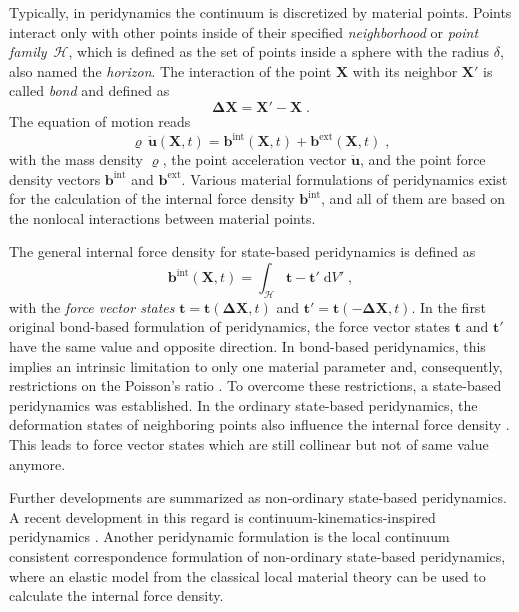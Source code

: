 \documentclass{juliacon}
\newcommand{\vb}{\boldsymbol}
\begin{document}
Typically, in peridynamics the continuum is discretized by material points.
Points interact only with other points inside of their specified \emph{neighborhood} or \emph{point family}~$\mathcal{H}$, which is defined as the set of points inside a sphere with the radius $\delta$, also named the \emph{horizon}.
The interaction of the point $\vb{X}$ with its neighbor $\vb{X}'$ is called \emph{bond} and defined as
\begin{equation}
\vb{\Delta X} = \vb{X}' - \vb{X} \; .
\end{equation}
The equation of motion reads
\begin{equation}
\varrho \, \vb{\ddot{u}}(\vb{X},t) = \vb{b}^{\mathrm{int}}(\vb{X},t) + \vb{b}^{\mathrm{ext}}(\vb{X},t) \; ,
\end{equation} 
with the mass density $\varrho$, the point acceleration vector $\vb{\ddot{u}}$, and the point force density vectors $\vb{b}^{\mathrm{int}}$ and $\vb{b}^{\mathrm{ext}}$.
Various material formulations of peridynamics exist for the calculation of the internal force density $\vb{b}^{\mathrm{int}}$, and all of them are based on the nonlocal interactions between material points.

The general internal force density for state-based peridynamics is defined as
\begin{equation}
\vb{b}^{\mathrm{int}} (\vb{X},t) = \int_\mathcal{H} \vb{t} - \vb{t}' \; \mathrm{d}V' \; ,
\end{equation}
with the \emph{force vector states} $\vb{t}=\vb{t}(\vb{\Delta X}, t)$ and $\vb{t}'=\vb{t}(-\vb{\Delta X}, t)$.
In the first original bond-based formulation of peridynamics, the force vector states $\vb{t}$ and  $\vb{t}'$ have the same value and opposite direction.
In bond-based peridynamics, this implies an intrinsic limitation to only one material parameter and, consequently, restrictions on the Poisson's ratio  \cite{Silling2007}.
To overcome these restrictions, a state-based peridynamics was established.
In the ordinary state-based peridynamics, the deformation states of neighboring points also influence the internal force density \cite{Silling2007}.
This leads to force vector states which are still collinear but not of same value anymore.

Further developments are summarized as non-ordinary state-based peridynamics.
A recent development in this regard is continuum-kinematics-inspired peridynamics \cite{Javili2019}.
Another peridynamic formulation is the local continuum consistent correspondence formulation of non-ordinary state-based peridynamics, where an elastic model from the classical local material theory can be used to calculate the internal force density.
\end{document}
